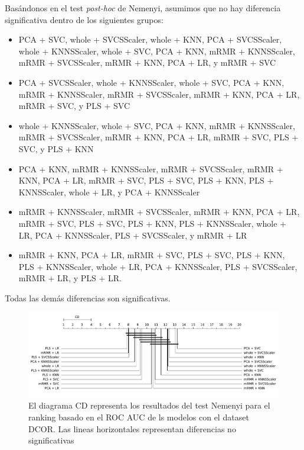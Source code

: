 \documentclass[a4paper,oneside,11pt,leqno]{article}
\begin{document}
	Basándonos en el test \textit{post-hoc} de Nemenyi, asumimos que no hay diferencia significativa dentro de los siguientes grupos:
	
	\begin{itemize}
		\item   PCA + SVC, whole + SVCSScaler, whole + KNN, PCA + SVCSScaler, whole + KNNSScaler, whole + SVC, PCA + KNN, mRMR + KNNSScaler, mRMR + SVCSScaler, mRMR + KNN, PCA + LR, y mRMR + SVC
		
		\item  PCA + SVCSScaler, whole + KNNSScaler, whole + SVC, PCA + KNN, mRMR + KNNSScaler, mRMR + SVCSScaler, mRMR + KNN, PCA + LR, mRMR + SVC, y PLS + SVC
		
		\item   whole + KNNSScaler, whole + SVC, PCA + KNN, mRMR + KNNSScaler, mRMR + SVCSScaler, mRMR + KNN, PCA + LR, mRMR + SVC, PLS + SVC, y PLS + KNN
		
		\item    PCA + KNN, mRMR + KNNSScaler, mRMR + SVCSScaler, mRMR + KNN, PCA + LR, mRMR + SVC, PLS + SVC, PLS + KNN, PLS + KNNSScaler, whole + LR, y PCA + KNNSScaler
		
		\item mRMR + KNNSScaler, mRMR + SVCSScaler, mRMR + KNN, PCA + LR, mRMR + SVC, PLS + SVC, PLS + KNN, PLS + KNNSScaler, whole + LR, PCA + KNNSScaler, PLS + SVCSScaler, y mRMR + LR
		
		\item  mRMR + KNN, PCA + LR, mRMR + SVC, PLS + SVC, PLS + KNN, PLS + KNNSScaler, whole + LR, PCA + KNNSScaler, PLS + SVCSScaler, mRMR + LR, y PLS + LR.
		
	\end{itemize}
	
	Todas las demás diferencias son significativas.
	
	
	\begin{figure}[h]
		\includegraphics[width=\linewidth]{stat_results_dcor.pdf}
		\caption{El diagrama CD representa los resultados del test Nemenyi para el ranking basado en el ROC AUC de ls modelos con el dataset DCOR. Las lineas horizontales representan diferencias no significativas}
		\label{fig:stats_fig_dcor}
	\end{figure}
	
\end{document}
